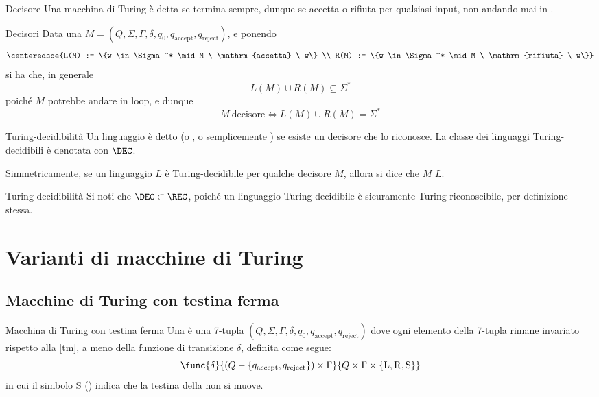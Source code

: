 \documentclass[a4paper, 12pt]{report}
\begin{document}
    \begin{frameddefn}{Decisore}
        Una macchina di Turing è detta  se termina sempre, dunque se accetta o rifiuta per qualsiasi input, non andando mai in .
    \end{frameddefn}

    \begin{framedobs}{Decisori}
        Data una \TM $M = (Q, \Sigma, \Gamma, \delta, q_0, q_\mathrm{accept}, q_\mathrm{reject})$, e ponendo $$\centeredsoe{L(M) := \{w \in \Sigma^* \mid M \ \mathrm{accetta} \ w\} \\ R(M) := \{w \in \Sigma^* \mid M \ \mathrm{rifiuta} \ w\}}$$ si ha che, in generale $$L(M) \cup R(M) \subseteq \Sigma^*$$ poiché $M$ potrebbe andare in loop, e dunque $$M \ \mathrm{decisore} \iff L(M) \cup R(M) = \Sigma^*$$
    \end{framedobs}

    \begin{frameddefn}{Turing-decidibilità}
        Un linguaggio è detto  (o , o semplicemente ) se esiste un decisore che lo riconosce. La classe dei linguaggi Turing-decidibili è denotata con $\mathrm{\DEC}$.

        Simmetricamente, se un linguaggio $L$ è Turing-decidibile per qualche decisore $M$, allora si dice che $M$  $L$.
    \end{frameddefn}

    \begin{framedobs}[label={dec in rec}]{Turing-decidibilità}
        Si noti che $\mathrm{\DEC} \subset \REC$, poiché un linguaggio Turing-decidibile è sicuramente Turing-riconoscibile, per definizione stessa.
    \end{framedobs}

    \section{Varianti di macchine di Turing}

    \subsection{Macchine di Turing con testina ferma}

    \begin{frameddefn}[label={stay tm}]{Macchina di Turing con testina ferma}
        Una  è una 7-tupla $(Q, \Sigma, \Gamma, \delta, q_0, q_\mathrm{accept}, q_\mathrm{reject})$ dove ogni elemento della 7-tupla rimane invariato rispetto alla \cref{tm}, a meno della funzione di transizione $\delta$, definita come segue: $$\func{\delta}{(Q - \{q_\mathrm{accept}, q_\mathrm{reject}\}) \times \Gamma}{Q \times \Gamma \times \{\mathrm L, \mathrm R, \mathrm S\}}$$ in cui il simbolo $\mathrm S$ () indica che la testina della \TM non si muove.
    \end{frameddefn}
\end{document}
